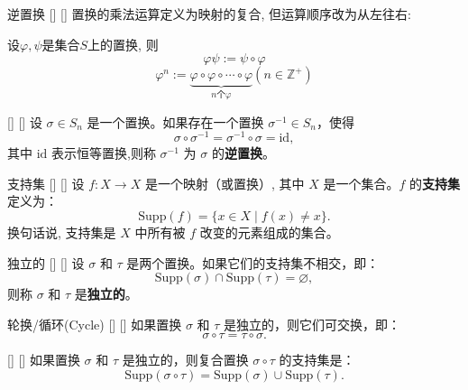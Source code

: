 \documentclass[UTF8]{ctexart}
\begin{document}
		\begin{dfn}
            []
            {逆置换}
            []
            []
			置换的乘法运算定义为映射的复合, 但运算顺序改为从左往右: 
			
			设$\varphi,\psi$是集合$S$上的置换, 则
			\[\varphi\psi:=\psi\circ\varphi\]
			\[\varphi^n:=\underbrace{\varphi\circ\varphi\circ\cdots\circ\varphi}_{n\text{个}\varphi}(n\in\mathbb{Z}^+)\]
		\end{dfn}

        \begin{dfn}
            []
            {}
            []
            []
            设 \(\sigma \in S_n\) 是一个置换。如果存在一个置换 \(\sigma^{-1} \in S_n\)，使得
            \[
            \sigma \circ \sigma^{-1} = \sigma^{-1} \circ \sigma = \text{id},
            \]
            其中 \(\text{id}\) 表示恒等置换,则称 \(\sigma^{-1}\) 为 \(\sigma\) 的\textbf{逆置换}。
       \end{dfn}

		\begin{dfn}
            []
            {支持集}
            []
            []
            设 \( f: X \to X \) 是一个映射（或置换）, 其中 \( X \) 是一个集合。\( f \) 的\textbf{支持集}定义为：
            \[
            \text{Supp}(f) = \{ x \in X \mid f(x) \neq x \}.
            \]
            换句话说, 支持集是 \( X \) 中所有被 \( f \) 改变的元素组成的集合。
        \end{dfn}

        \begin{dfn}
            []
            {独立的}
            []
            []
            设 \( \sigma \) 和 \( \tau \) 是两个置换。如果它们的支持集不相交，即：
            \[
            \text{Supp}(\sigma) \cap \text{Supp}(\tau) = \varnothing ,
            \]
            则称 \( \sigma \) 和 \( \tau \) 是\textbf{独立的}。
        \end{dfn}

		\begin{ppt}
            []
            {轮换/循环(Cycle)}
            []
            []
			如果置换 \( \sigma \) 和 \( \tau \) 是独立的，则它们可交换，即：
			\[
			\sigma \circ \tau = \tau \circ \sigma.
			\]
		\end{ppt}

		\begin{ppt}
            []
            {}
            []
            []
			如果置换 \( \sigma \) 和 \( \tau \) 是独立的，则复合置换 \( \sigma \circ \tau \) 的支持集是：
			\[
			\text{Supp}(\sigma \circ \tau) = \text{Supp}(\sigma) \cup \text{Supp}(\tau).
			\]
		\end{ppt}
\end{document}

